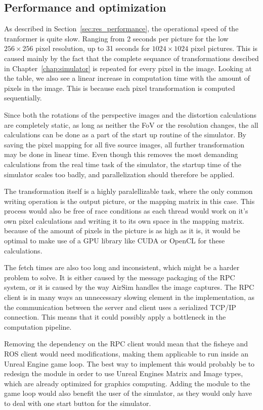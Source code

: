 \subsection{Performance and optimization} \label{sec:disc_performance}

As described in Section~\ref{sec:res_performance}, the operational speed of the tranformer is quite slow. Ranging from 2 seconds per picture for the low $256\times 256$ pixel resolution, up to 31 seconds for $1024 \times 1024$ pixel pictures. This is caused mainly by the fact that the complete sequance of transformations descibed in Chapter~\ref{chap:simulator} is repeated for every pixel in the image. Looking at the table, we also see a linear increase in computation time with the amount of pixels in the image. This is because each pixel transformation is computed sequentially.

Since both the rotations of the perspective images and the distortion calculations are completely static, as long as neither the FoV or the resolution changes, the all calculations can be done as a part of the start up routine of the simulator. By saving the pixel mapping for all five source images, all further transformation may be done in linear time. Even though this removes the most demanding calculations from the real time task of the simulator, the startup time of the simulator scales too badly, and parallelization should therefore be applied.

The transformation itself is a highly paralellizable task, where the only common writing operation is the output picture, or the mapping matrix in this case. This process would also be free of race conditions as each thread would work on it's own pixel calculations and writing it to its own space in the mapping matrix. because of the amount of pixels in the picture is as high as it is, it would be optimal to make use of a GPU library like CUDA or OpenCL for these calculations.

The fetch times are also too long and inconsistent, which might be a harder problem to solve. It is either caused by the message packaging of the RPC system, or it is caused by the way AirSim handles the image captures. The RPC client is in many ways an unnecessary slowing element in the implementation, as the communication between the server and client uses a serialized TCP/IP connection. This means that it could possibly apply a bottleneck in the computation pipeline.

Removing the dependency on the RPC client would mean that the fisheye and ROS client would need modifications, making them applicable to run inside an Unreal Engine game loop. The best way to implement this would probably be to redesign the module in order to use Unreal Engines Matrix and Image types, which are already optimized for graphics computing. Adding the module to the game loop would also benefit the user of the simulator, as they would only have to deal with one start button for the simulator. 


\cleardoublepage